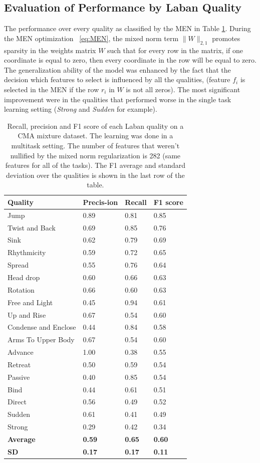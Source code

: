 \documentclass{sigchi}
\begin{document}
\subsection{Evaluation of Performance by Laban Quality}
The performance over every quality as classified by the MEN in Table
\ref{mixedSummary}. During the MEN optimization ~\eqref{eq:MEN}, the mixed norm
term $\|W\|_{2,1}$  promotes sparsity in the weights matrix $W$ such that for
every row in the matrix, if one coordinate is equal to zero, then every coordinate
in the row will be equal to zero.
\\The generalization ability of the model was enhanced by the fact that the
decision which features to select is influenced by all the qualities, (feature $f_i$ is
selected in the MEN if the row $r_i$ in $W$ is not all zeros). The most
significant improvement were in the qualities that performed worse in the
single task learning setting (\textit{Strong} and \textit{Sudden} for example).
\begin{table}[!h]
\centering
\begin{tabular}{|p{3cm}|p{0.9cm}|p{0.9cm}|p{0.9cm}|}
\hline
Quality&Precis-ion&Recall&F1 score\\\hline
Jump&0.89&0.81&0.85\\\hline
Twist and Back&0.69&0.85&0.76\\\hline
Sink&0.62&0.79&0.69\\\hline
Rhythmicity&0.59&0.72&0.65\\\hline
Spread&0.55&0.76&0.64\\\hline
Head drop&0.60&0.66&0.63\\\hline
Rotation&0.66&0.60&0.63\\\hline
Free and Light&0.45&0.94&0.61\\\hline
Up and Rise&0.67&0.54&0.60\\\hline
Condense and Enclose&0.44&0.84&0.58\\\hline
Arms To Upper Body&0.67&0.54&0.60\\\hline
Advance&1.00&0.38&0.55\\\hline
Retreat&0.50&0.59&0.54\\\hline
Passive&0.40&0.85&0.54\\\hline
Bind&0.44&0.61&0.51\\\hline
Direct&0.56&0.49&0.52\\\hline
Sudden&0.61&0.41&0.49\\\hline
Strong&0.29&0.42&0.34\\\hline
\textbf{Average}&\textbf{0.59}&\textbf{0.65}&\textbf{0.60}\\\hline
\textbf{SD}&\textbf{0.17}&\textbf{0.17}&\textbf{0.11}\\\hline
\end{tabular}
\caption{Recall, precision and F1 score of each Laban quality on a CMA
mixture dataset. The learning was done in a multitask setting. The number of
features that weren't nullified by the mixed norm regularization is
282 (same features for all of the tasks). The F1 average and standard
deviation over the qualities is shown in the last row of the table.}
\label{mixedSummary}
\end{table}
\end{document}
